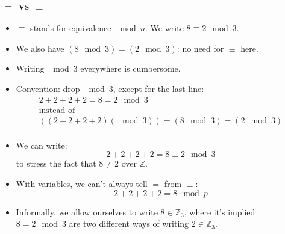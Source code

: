 \begin{frame}
\frametitle{$=$ vs $\equiv$}

\begin{itemize}
\item $\equiv$ stands for equivalence $\mod n$. We write $8\equiv 2 \mod 3 $.
\item We also have $(8\mod 3)= (2\mod 3)$: no need for $\equiv$ here.
\item Writing $\mod 3$ everywhere is cumbersome.
\item Convention: drop $\mod 3$, except for the last line:
\[
\begin{array}{c}
2+2+2+2 = 8=2 \mod 3\\
\text{instead of}\\

((2+2+2+2) (\mod 3))=(8 \mod 3) = (2\mod 3) \\
\end{array}
\]
\item We can write:
\[
2+2+2+2=8\equiv 2 \mod 3
\]
to stress the fact that $8\neq 2$ over $\mathbb Z$.
\item With variables, we can't always tell $=$ from $\equiv$:
\[
2+2+2+2=8 \mod p
\] 
\item Informally, we allow ourselves to write $8\in \mathbb Z_3$, where it's implied $8=2\mod 3$ are two different ways of writing $2\in \mathbb Z_3$.
\end{itemize}
\end{frame}